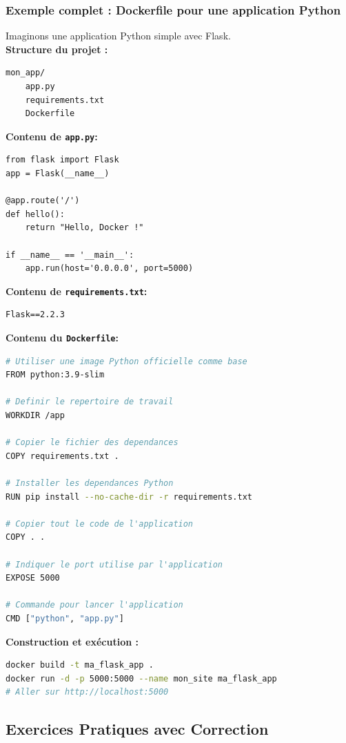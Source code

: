 \documentclass[a4paper,12pt]{article}
\begin{document}
\subsubsection{Exemple complet : Dockerfile pour une application Python}
Imaginons une application Python simple avec Flask.
\\[0.5cm]
\textbf{Structure du projet :}
\begin{verbatim}
mon_app/
    app.py
    requirements.txt
    Dockerfile
\end{verbatim}
\textbf{Contenu de \texttt{app.py}:}
\begin{lstlisting}
from flask import Flask
app = Flask(__name__)

@app.route('/')
def hello():
    return "Hello, Docker !"

if __name__ == '__main__':
    app.run(host='0.0.0.0', port=5000)
\end{lstlisting}
\textbf{Contenu de \texttt{requirements.txt}:}
\begin{lstlisting}
Flask==2.2.3
\end{lstlisting}
\textbf{Contenu du \texttt{Dockerfile}:}
\begin{lstlisting}[language=bash]
# Utiliser une image Python officielle comme base
FROM python:3.9-slim

# Definir le repertoire de travail
WORKDIR /app

# Copier le fichier des dependances
COPY requirements.txt .

# Installer les dependances Python
RUN pip install --no-cache-dir -r requirements.txt

# Copier tout le code de l'application
COPY . .

# Indiquer le port utilise par l'application
EXPOSE 5000

# Commande pour lancer l'application
CMD ["python", "app.py"]
\end{lstlisting}
\textbf{Construction et exécution :}
\begin{lstlisting}[language=bash]
docker build -t ma_flask_app .
docker run -d -p 5000:5000 --name mon_site ma_flask_app
# Aller sur http://localhost:5000
\end{lstlisting}

\subsection{Exercices Pratiques avec Correction}
\end{document}
